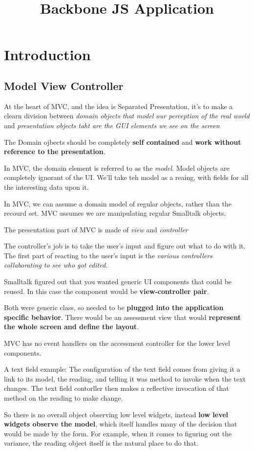 \documentclass[a4paper, 11pt]{book}
\title{Backbone JS Application}
\begin{document}
\chapter{Introduction}
\section{Model View Controller}
At the heart of MVC, and the idea is Separated Presentation, it's to make a
clearn division between \emph{domain objects that model our perception of the
real world} and \emph{presentation objects taht are the GUI elements we see on
the screen}

The Domain ojbects should be completely \textbf{self contained} and \textbf{work
without reference to the presentation}.

In MVC, the domain element is referred to as the \emph{model}. Model objects are
completely ignorant of the UI. We'll take teh model as a reaing, with fields for
all the interesting data upon it. 

In MVC, we can assume a domain model of regular objects, rather than the recourd
set. MVC assumes we are manipulating regular Smalltalk objects.

The presentation part of MVC is made of \emph{view} and \emph{controller}

The controller's job is to take the user's input and figure out what to do with
it. The first part of reacting to the user's input is the \emph{various
controllers collaborating to see who got edited}.

Smalltalk figured out that you wanted generic UI components that could be
reused. In this case the component would be \textbf{view-controller pair}.

Both were generic class, so needed to be \textbf{plugged into the application
specific behavior}. There would be an assessment view that would 
\textbf{represent the whole screen and define the layout}.

MVC has no event handlers on the accessment controller for the lower level
components.

A text field example: The configuration of the text field comes from giving it a
link to its model, the reading, and telling it was method to invoke when the
text changes. The text field contorller then makes a reflective invocation of
that method on the reading to make change.

So there is no overall object observing low level widgets, instead \textbf{low
level widgets observe the model}, which itself handles many of the decision that
would be made by the form. For example, when it comes to figuring out the
variance, the reading object itself is the natural place to do that.
\end{document}
